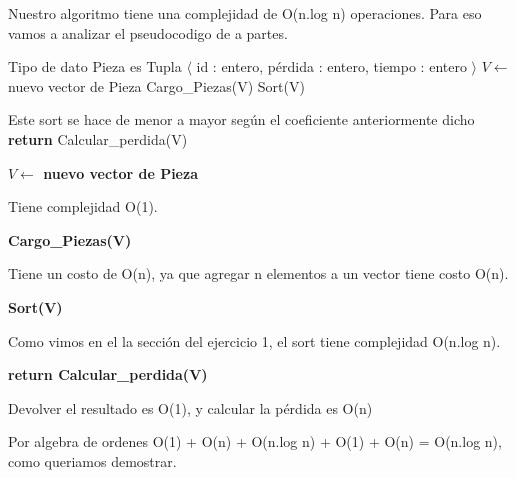 Nuestro algoritmo tiene una complejidad de O(n.log n) operaciones. Para eso vamos a analizar el pseudocodigo de a partes.

\begin{pseudo}
\State Tipo de dato Pieza es Tupla $\langle$ id : entero, pérdida : entero, tiempo : entero $\rangle$
        \State $V \leftarrow$ nuevo vector de Pieza 
        \State Cargo\_Piezas(V) 
        \State Sort(V) 
        
        \Comment Este sort se hace de menor a mayor según el coeficiente anteriormente dicho
        \State \textbf{return} Calcular\_perdida(V) 
    \EndProcedure
\end{pseudo}

\begin{pseudo}
 \State  \textbf{$V \leftarrow$ nuevo vector de Pieza}
\end{pseudo}

Tiene complejidad O(1).

\begin{pseudo}
 \State \textbf{Cargo\_Piezas(V)}
\end{pseudo}

Tiene un costo de O(n), ya que agregar n elementos a un vector tiene costo O(n).

\begin{pseudo}
 \State \textbf{Sort(V)}
\end{pseudo}

Como vimos en el la sección del ejercicio 1, el sort tiene complejidad O(n.log n).

\begin{pseudo}
 \State \textbf{return Calcular\_perdida(V)}
\end{pseudo}

Devolver el resultado es O(1), y calcular la pérdida es O(n)

Por algebra de ordenes O(1) + O(n) + O(n.log n) + O(1) + O(n) = O(n.log n), como queriamos demostrar.
